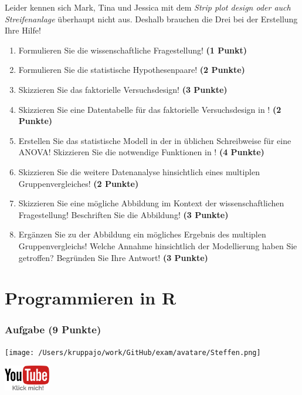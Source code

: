 \documentclass[a4paper, 9pt]{scrartcl}\usepackage[]{graphicx}\usepackage[]{xcolor}
\begin{document}
Leider kennen sich Mark, Tina und Jessica mit dem \textit{Strip plot design oder auch Streifenanlage} überhaupt nicht aus. Deshalb brauchen die Drei bei der Erstellung Ihre Hilfe!

\begin{enumerate}
  \setcounter{enumi}{0}
  \item Formulieren Sie die wissenschaftliche Fragestellung! \textbf{(1 Punkt)}
  \item Formulieren Sie die statistische Hypothesenpaare! \textbf{(2 Punkte)}
  \item Skizzieren Sie das faktorielle Versuchsdesign! \textbf{(3 Punkte)}
  \item Skizzieren Sie eine Datentabelle für das faktorielle Versuchsdesign in \Rlogo! \textbf{(2 Punkte)}
  \item Erstellen Sie das statistische Modell in der in \Rlogo üblichen Schreibweise für eine ANOVA! Skizzieren Sie die notwendige Funktionen in \Rlogo! \textbf{(4 Punkte)}
  \item Skizzieren Sie die weitere Datenanalyse hinsichtlich eines multiplen Gruppenvergleiches! \textbf{(2 Punkte)}
  \item Skizzieren Sie eine mögliche Abbildung im Kontext der wissenschaftlichen Fragestellung! Beschriften Sie die Abbildung! \textbf{(3 Punkte)}
  \item Ergänzen Sie zu der Abbildung ein mögliches Ergebnis des multiplen Gruppenvergleichs! Welche Annahme hinsichtlich der Modellierung haben Sie getroffen? Begründen Sie Ihre Antwort! \textbf{(3 Punkte)}
\end{enumerate} 
\clearpage
\part{Programmieren in R}

\section{Aufgabe \hfill (9 Punkte)}



 
\begin{minipage}[t]{0.5\textwidth}
\texttt{[image: /Users/kruppajo/work/GitHub/exam/avatare/Steffen.png]}
\end{minipage}
\begin{minipage}[t]{0.5\textwidth}
\hfill
\href{https://www.youtube.com/playlist?list=PLe51bCp9JvEFUnFqaJG5aRmON9i1ZbOYC}{\includegraphics[width = 2cm]{img/youtube}}
\end{minipage}
\vspace{-3ex}
\end{document}
